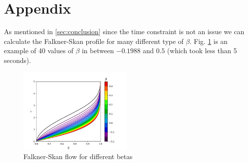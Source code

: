 \documentclass[conf]{new-aiaa}
\begin{document}
\appendix
\section{Appendix}
As mentioned in \ref{sec:conclusion} since the time constraint is not an issue we can calculate the Falkner-Skan profile for many different type of $\beta$. Fig. \ref{fig:Falkner-Skan multiples betas} is an example of 40 values of $\beta$ in between $-0.1988$ and $0.5$ (which took less than 5 seconds). 
\begin{figure}[H]
    \centering
    \includegraphics[width=0.5\textwidth]{Continuous beta.png}
    \caption{Falkner-Skan flow for different betas}
    \label{fig:Falkner-Skan multiples betas}
\end{figure}
\end{document}
